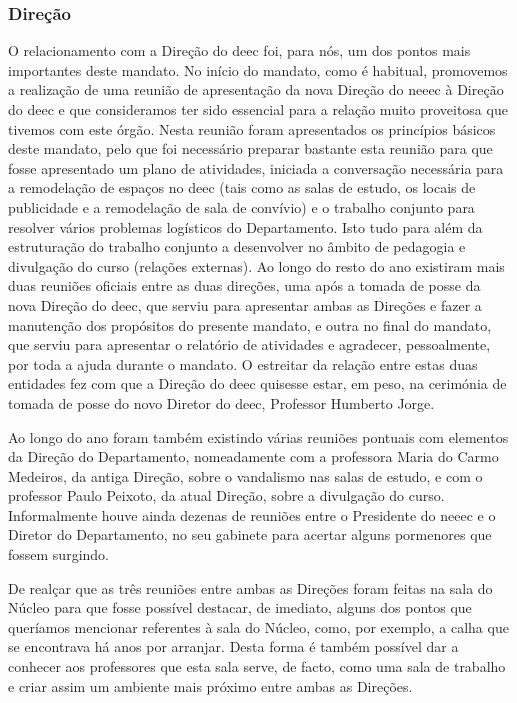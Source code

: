 
\subsubsection{Direção}

O relacionamento com a Direção do \acrshort{deec} foi, para nós, um dos pontos mais importantes deste mandato. No início do mandato, como é habitual, promovemos a realização de uma reunião de apresentação da nova Direção do \acrshort{neeec} à Direção do \acrshort{deec} e que consideramos ter sido essencial para a relação muito proveitosa que tivemos com este órgão. Nesta reunião foram apresentados os princípios básicos deste mandato, pelo que foi necessário preparar bastante esta reunião para que fosse apresentado um plano de atividades, iniciada a conversação necessária para a remodelação de espaços no \acrshort{deec} (tais como as salas de estudo, os locais de publicidade e a remodelação de sala de convívio) e o trabalho conjunto para resolver vários problemas logísticos do Departamento. Isto tudo para além da estruturação do trabalho conjunto a desenvolver no âmbito de pedagogia e divulgação do curso (relações externas). Ao longo do resto do ano existiram mais duas reuniões oficiais entre as duas direções, uma após a tomada de posse da nova Direção do \acrshort{deec}, que serviu para apresentar ambas as Direções e fazer a manutenção dos propósitos do presente mandato, e outra no final do mandato, que serviu para apresentar o relatório de atividades e agradecer, pessoalmente, por toda a ajuda durante o mandato. O estreitar da relação entre estas duas entidades fez com que a Direção do \acrshort{deec} quisesse estar, em peso, na cerimónia de tomada de posse do novo Diretor do \acrshort{deec}, Professor Humberto Jorge.

Ao longo do ano foram também existindo várias reuniões pontuais com elementos da Direção do Departamento, nomeadamente com a professora Maria do Carmo Medeiros, da antiga Direção, sobre o vandalismo nas salas de estudo, e com o professor Paulo Peixoto, da atual Direção, sobre a divulgação do curso. Informalmente houve ainda dezenas de reuniões entre o Presidente do \acrshort{neeec} e o Diretor do Departamento, no seu gabinete para acertar alguns pormenores que fossem surgindo.

De realçar que as três reuniões entre ambas as Direções foram feitas na sala do Núcleo para que fosse possível destacar, de imediato, alguns dos pontos que queríamos mencionar referentes à sala do Núcleo, como, por exemplo, a calha que se encontrava há anos por arranjar. Desta forma é também possível dar a conhecer aos professores que esta sala serve, de facto, como uma sala de trabalho e criar assim um ambiente mais próximo entre ambas as Direções.